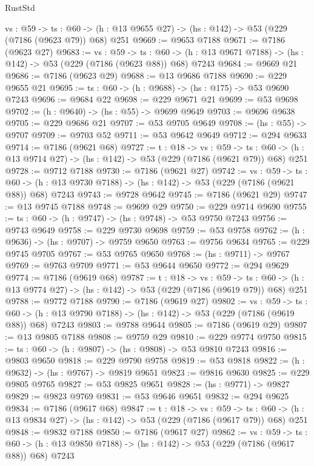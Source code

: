 \begin{lexlean}{RustStd}
\begin{coremodule}
  {vs : @59} ->
  {ts : @60} -> (h : @13 @9655 @27) -> (hs : @142) -> @53 (@229 (@7186 (@9623 @79)) @68) @251
@9669 := @9653 @7188
@9671 := @7186 (@9623 @27)
@9683 := {vs : @59} ->
  {ts : @60} -> (h : @13 @9671 @7188) -> (hs : @142) -> @53 (@229 (@7186 (@9623 @88)) @68) @7243
@9684 := @9669 @21
@9686 := @7186 (@9623 @29)
@9688 := @13 @9686 @7188
@9690 := @229 @9655 @21
@9695 := {ts : @60} -> (h : @9688) -> (hs : @175) -> @53 @9690 @7243
@9696 := @9684 @22
@9698 := @229 @9671 @21
@9699 := @53 @9698
@9702 := (h : @9640) -> (hs : @55) -> @9699 @9649
@9703 := @9696 @9638
@9705 := @229 @9686 @21
@9707 := @53 @9705 @9649
@9708 := (hs : @55) -> @9707
@9709 := @9703 @52
@9711 := @53 @9642 @9649
@9712 := @294 @9633
@9714 := @7186 (@9621 @68)
@9727 := {t : @18} ->
  {vs : @59} ->
  {ts : @60} -> (h : @13 @9714 @27) -> (hs : @142) -> @53 (@229 (@7186 (@9621 @79)) @68) @251
@9728 := @9712 @7188
@9730 := @7186 (@9621 @27)
@9742 := {vs : @59} ->
  {ts : @60} -> (h : @13 @9730 @7188) -> (hs : @142) -> @53 (@229 (@7186 (@9621 @88)) @68) @7243
@9743 := @9728 @9642
@9745 := @7186 (@9621 @29)
@9747 := @13 @9745 @7188
@9748 := @9699 @29
@9750 := @229 @9714 @9690
@9755 := {ts : @60} -> (h : @9747) -> (hs : @9748) -> @53 @9750 @7243
@9756 := @9743 @9649
@9758 := @229 @9730 @9698
@9759 := @53 @9758
@9762 := (h : @9636) -> (hs : @9707) -> @9759 @9650
@9763 := @9756 @9634
@9765 := @229 @9745 @9705
@9767 := @53 @9765 @9650
@9768 := (hs : @9711) -> @9767
@9769 := @9763 @9709
@9771 := @53 @9644 @9650
@9772 := @294 @9629
@9774 := @7186 (@9619 @68)
@9787 := {t : @18} ->
  {vs : @59} ->
  {ts : @60} -> (h : @13 @9774 @27) -> (hs : @142) -> @53 (@229 (@7186 (@9619 @79)) @68) @251
@9788 := @9772 @7188
@9790 := @7186 (@9619 @27)
@9802 := {vs : @59} ->
  {ts : @60} -> (h : @13 @9790 @7188) -> (hs : @142) -> @53 (@229 (@7186 (@9619 @88)) @68) @7243
@9803 := @9788 @9644
@9805 := @7186 (@9619 @29)
@9807 := @13 @9805 @7188
@9808 := @9759 @29
@9810 := @229 @9774 @9750
@9815 := {ts : @60} -> (h : @9807) -> (hs : @9808) -> @53 @9810 @7243
@9816 := @9803 @9650
@9818 := @229 @9790 @9758
@9819 := @53 @9818
@9822 := (h : @9632) -> (hs : @9767) -> @9819 @9651
@9823 := @9816 @9630
@9825 := @229 @9805 @9765
@9827 := @53 @9825 @9651
@9828 := (hs : @9771) -> @9827
@9829 := @9823 @9769
@9831 := @53 @9646 @9651
@9832 := @294 @9625
@9834 := @7186 (@9617 @68)
@9847 := {t : @18} ->
  {vs : @59} ->
  {ts : @60} -> (h : @13 @9834 @27) -> (hs : @142) -> @53 (@229 (@7186 (@9617 @79)) @68) @251
@9848 := @9832 @7188
@9850 := @7186 (@9617 @27)
@9862 := {vs : @59} ->
  {ts : @60} -> (h : @13 @9850 @7188) -> (hs : @142) -> @53 (@229 (@7186 (@9617 @88)) @68) @7243

\end{coremodule}
\end{lexlean}
